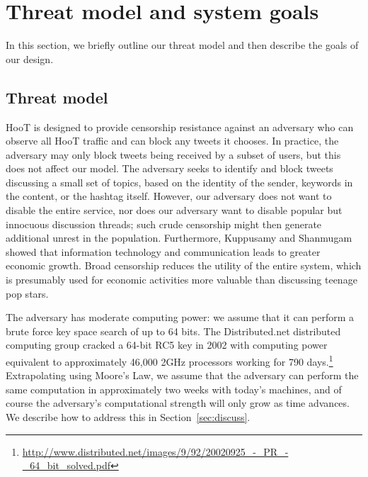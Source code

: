 \section{Threat model and system goals}

In this section, we briefly outline our threat model and then describe
the goals of our design.

\subsection{Threat model} \label{sec:threat}
HooT is designed to provide censorship resistance against an adversary
who can observe all HooT traffic and can block any tweets it chooses. In
practice, the adversary may only block tweets being received by a subset of users,
but this does not affect our model. The adversary seeks to identify and
block tweets discussing a small set of topics, based on the identity of
the sender, keywords in the content, or the hashtag itself. However,
our adversary does not want to disable the entire service, nor does
our adversary want to disable popular but innocuous discussion
threads; such crude censorship might
then generate additional unrest in the population. 
Furthermore, Kuppusamy and Shanmugam~\cite{ict-economy} showed that information technology 
and communication leads to greater economic growth. Broad censorship 
reduces the utility of the entire system, which is presumably used for
economic activities more valuable than discussing teenage pop stars.


The adversary has moderate computing power: we assume that it can
perform a brute force key space search of up to 64 bits. The
Distributed.net distributed computing group cracked a 64-bit RC5 key in
2002 with computing power equivalent to approximately 46,000 2GHz
processors working for 790
days.\footnote{\url{http://www.distributed.net/images/9/92/20020925_-_PR_-_64_bit_solved.pdf}}
Extrapolating using Moore's Law, we assume that the adversary can
perform the same computation in approximately two weeks with today's
machines, and of course the adversary's computational strength will
only grow as time advances. We describe how
to address this in Section~\ref{sec:discuss}.

